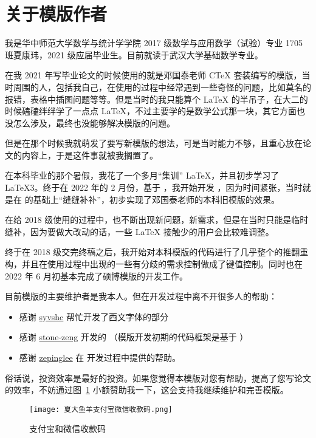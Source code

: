 
\section{关于模版作者}

我是华中师范大学数学与统计学学院 2017 级数学与应用数学（试验）专业 1705 班夏康玮，2021 级应届毕业生。目前就读于武汉大学基础数学专业。

在我 2021 年写毕业论文的时候使用的就是邓国泰老师 CTeX 套装编写的模版，当时周围的人，包括我自己，在使用的过程中经常遇到一些奇怪的问题，比如莫名的报错，表格中插图问题等等。但是当时的我只能算个 \LaTeX{} 的半吊子，在大二的时候磕磕绊绊学了一点点 \LaTeX{}，不过主要学的是数学公式那一块，其它方面也没怎么涉及，最终也没能够解决模版的问题。

但是在那个时候我就萌发了要写新模版的想法，可是当时能力不够，且重心放在论文的内容上，于是这件事就被我搁置了。

在本科毕业的那个暑假，我花了一个多月“集训” \LaTeX{}，并且初步学习了 \LaTeX3。终于在 2022 年的 2 月份，基于 ，我开始开发 ，因为时间紧张，当时就是在  的基础上“缝缝补补”，初步实现了邓国泰老师的本科旧模版的效果。

在给 2018 级使用的过程中，也不断出现新问题，新需求，但是在当时只能是临时缝补，因为要做大改动的话，一些 \LaTeX{} 接触少的用户会比较难调整。

终于在 2018 级交完终稿之后，我开始对本科模版的代码进行了几乎整个的推翻重构，并且在使用过程中出现的一些有分歧的需求控制做成了键值控制。同时也在 2022 年 6 月初基本完成了硕博模版的开发工作。

目前模版的主要维护者是我本人。但在开发过程中离不开很多人的帮助：
\begin{itemize}
  \item 感谢 \href{https://github.com/syvshc}{syvshc} 帮忙开发了西文字体的部分
  \item 感谢 \href{https://github.com/stone-zeng}{stone-zeng} 开发的  （模版开发初期的代码框架是基于 ）
  \item 感谢 \href{https://github.com/zepinglee}{zepinglee} 在  开发过程中提供的帮助。
\end{itemize}

俗话说，投资效率是最好的投资。如果您觉得本模版对您有帮助，提高了您写论文的效率，不妨通过图~\ref{figure:alipay-wechat} 小额赞助我一下，这会支持我继续维护和完善模版。

\begin{figure}[htbp]
  \centering
  \texttt{[image: 夏大鱼羊支付宝微信收款码.png]}
  \caption{支付宝和微信收款码}
  \label{figure:alipay-wechat}
\end{figure}